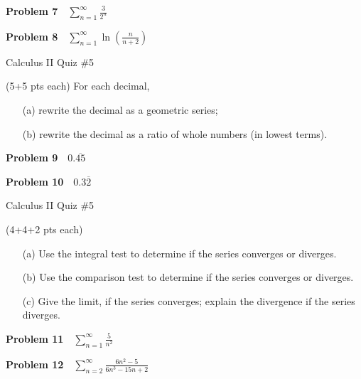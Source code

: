 \documentclass[10pt]{article}
\newcommand{\prob}[1]{\vspace{10mm} \noindent \textbf{Problem #1} \,\,}
\newcommand{\header}{
\begin{center}
Calculus II Quiz \#5
\end{center}

\vspace{2mm}

}
\begin{document}
\prob{7} $\sum\limits_{n = 1}^{\infty} \frac{3}{2^n}$

\vspace{25mm}

\prob{8} $\sum\limits_{n = 1}^{\infty} \ln\left(\frac{n}{n+2}\right)$

\pagebreak

\header

(5+5 pts each) For each decimal, 
\begin{itemize}
\item[(a) ] rewrite the decimal as a geometric series;
\item[(b) ] rewrite the decimal as a ratio of whole numbers (in lowest terms).
\end{itemize}

\prob{9} $0.\overline{45}$

\vspace{60mm} 

\prob{10} $0.3\overline{2}$

\pagebreak

\header

(4+4+2 pts each) 
\begin{itemize}
\item[(a) ] Use the integral test to determine if the series converges or diverges. 
\item[(b) ] Use the comparison test to determine if the series converges or diverges. 
\item[(c) ] Give the limit, if the series converges; explain the divergence if the series diverges.
\end{itemize}

\vspace{10mm}

\prob{11}
$\sum\limits_{n=1}^{\infty} \frac{5}{n^2}$

\vspace{60mm}

\prob{12} 
$\sum\limits_{n=2}^{\infty} \frac{6n^2 - 5}{6n^3 - 15n + 2}$
\end{document}
